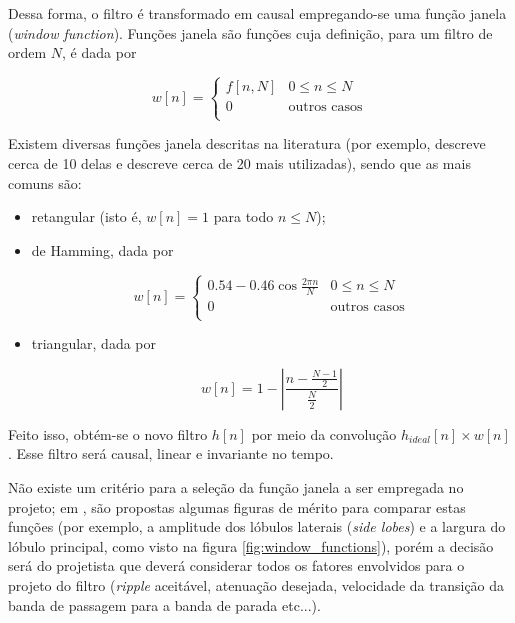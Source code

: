 Dessa forma, o filtro é transformado em causal empregando-se uma função janela (\textit{window function}). Funções janela são funções cuja definição, para um filtro de ordem $N$, é dada por

\[ w[n] = \begin{cases} 
      f[n, N] & 0 \leq n \leq N \\
      0 & \text{outros casos} \\
   \end{cases}
\]

Existem diversas funções janela descritas na literatura (por exemplo, \cite{diniz} descreve cerca de 10 delas e \cite{harris} descreve cerca de 20 mais utilizadas), sendo que as mais comuns são:

\begin{itemize}
\item retangular (isto é, $w[n] = 1$ para todo $n \leq N$);
\item de Hamming, dada por

\[ w[n] = \begin{cases} 
      0.54 - 0.46 \cos{\frac{2 \pi n}{N}} & 0 \leq n \leq N \\
      0 & \text{outros casos} \\
   \end{cases}
\]
\item triangular, dada por 

\begin{equation}
w[n] = 1 - \left|\frac{n-\frac{N-1}{2}}{\frac{N}{2}}\right|
\end{equation}

\end{itemize}

Feito isso, obtém-se o novo filtro $h[n]$ por meio da convolução $h_{ideal}[n] \times w[n]$. Esse filtro será causal, linear e invariante no tempo.

Não existe um critério para a seleção da função janela a ser empregada no projeto; em \cite{harris}, são propostas algumas figuras de mérito para comparar estas funções (por exemplo, a amplitude dos lóbulos laterais (\textit{side lobes}) e a largura do lóbulo principal, como visto na figura \ref{fig:window_functions}), porém a decisão será do projetista que deverá considerar todos os fatores envolvidos para o projeto do filtro (\textit{ripple} aceitável, atenuação desejada, velocidade da transição da banda de passagem para a banda de parada etc...).

